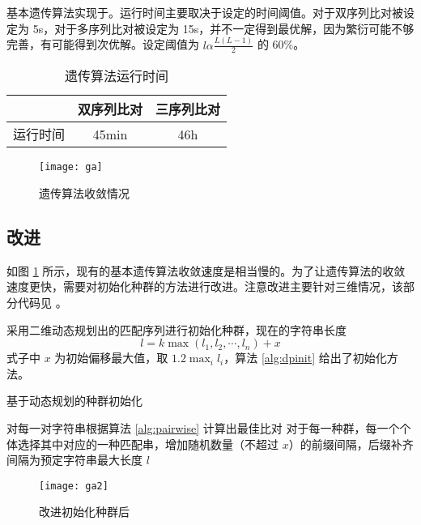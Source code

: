     基本遗传算法实现于。运行时间主要取决于设定的时间阈值。对于双序列比对被设定为 5s，对于多序列比对被设定为 15s，并不一定得到最优解，因为繁衍可能不够完善，有可能得到次优解。设定阈值为 $l\alpha\frac{L(L-1)}{2}$ 的 60\%。

    \noindent
    \begin{minipage}{0.6\textwidth}
        \begin{table}[H]
            \centering
            \caption{遗传算法运行时间}\label{tab:ga}
            \begin{tabular}{ccc}
                \toprule
                 & 双序列比对 & 三序列比对 \\
                \midrule
                运行时间 & 45min & 46h \\
                \bottomrule
            \end{tabular}
        \end{table}
    \end{minipage}
    \begin{minipage}{0.4\textwidth}
        \begin{figure}[H]
            \centering
            \texttt{[image: ga]}
            \caption{遗传算法收敛情况}\label{fig:ga}
        \end{figure}
    \end{minipage}
    \vspace*{5pt}

    \subsection{改进}

    如图 \ref{fig:ga} 所示，现有的基本遗传算法收敛速度是相当慢的。为了让遗传算法的收敛速度更快，需要对初始化种群的方法进行改进。注意改进主要针对三维情况，该部分代码见 。

    采用二维动态规划出的匹配序列进行初始化种群\cite{simplega}，现在的字符串长度
    \begin{equation}
        l = k\max{(l_1,l_2,\cdots,l_n)}+x
    \end{equation}
    式子中 $x$ 为初始偏移最大值，取 $1.2\max_i{l_i}$，算法 \ref{alg:dpinit} 给出了初始化方法。

    \noindent
    \begin{minipage}{0.6\textwidth}
        \begin{algorithm}[H]
            \caption{基于动态规划的种群初始化}\label{alg:dpinit}
            对每一对字符串根据算法 \ref{alg:pairwise} 计算出最佳比对\;
            对于每一种群，每一个个体选择其中对应的一种匹配串，增加随机数量（不超过 $x$）的前缀间隔，后缀补齐间隔为预定字符串最大长度 $l$\;
        \end{algorithm}
    \end{minipage}
    \begin{minipage}{0.4\textwidth}
        \begin{figure}[H]
            \centering
            \texttt{[image: ga2]}
            \caption{改进初始化种群后}\label{fig:ga2}
        \end{figure}
    \end{minipage}
    \vspace*{5pt}

